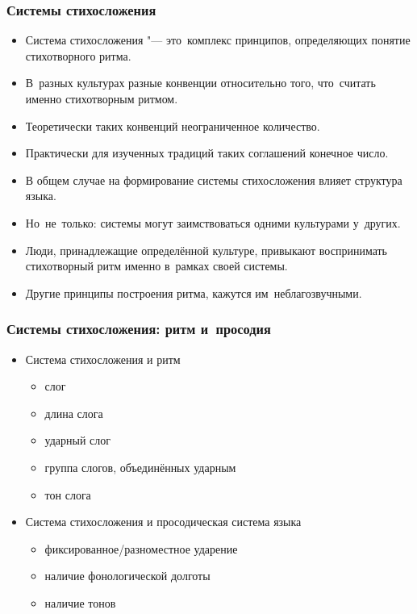 \documentclass{beamer}
\begin{document}
\begin{frame}
\frametitle{Системы стихосложения}

\begin{itemize}
\item Система стихосложения "--- это~комплекс принципов, определяющих понятие стихотворного ритма.
\item В~разных культурах разные конвенции относительно того, что~считать именно стихотворным ритмом.
\item Теоретически таких конвенций неограниченное количество.
\item Практически для изученных традиций таких соглашений конечное число.
\item В общем случае на формирование системы стихосложения влияет структура языка.
\item Но~не~только: системы могут заимствоваться одними культурами у~других.
\item Люди, принадлежащие определённой культуре, привыкают воспринимать стихотворный ритм именно в~рамках своей системы.
\item Другие принципы построения ритма, кажутся им~неблагозвучными.
\end{itemize}

\end{frame}


\begin{frame}
\frametitle{Системы стихосложения: ритм и~просодия}

\begin{itemize}
\item Система стихосложения и ритм
\begin{itemize}
\item слог
\item длина слога
\item ударный слог
\item группа слогов, объединённых ударным
\item тон слога
\end{itemize}
\item Система стихосложения и просодическая система языка
\begin{itemize}
\item фиксированное/разноместное ударение
\item наличие фонологической долготы
\item наличие тонов
\end{itemize}
\end{itemize}

\end{frame}
\end{document}
